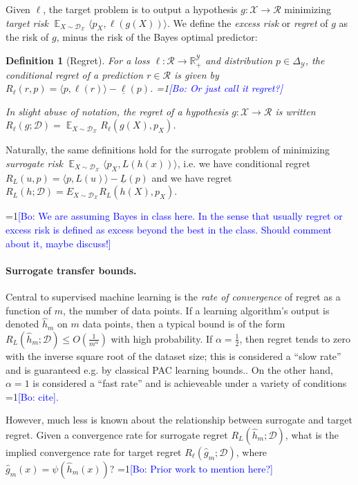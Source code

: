 \documentclass{article}
\newtheorem{definition}{Definition}
\newcommand{\Comments}{1}
\newcommand{\mynote}[2]{\ifnum\Comments=1\textcolor{#1}{#2}\fi}
\newcommand{\bo}[1]{\mynote{blue}{[Bo: #1]}}
\DeclareMathOperator{\E}{\mathbb{E}}  %
\newcommand{\reals}{\mathbb{R}}
\newcommand{\simplex}{\Delta_\Y}
\newcommand{\D}{\mathcal{D}}
\newcommand{\R}{\mathcal{R}}
\newcommand{\X}{\mathcal{X}}
\newcommand{\Y}{\mathcal{Y}}
\newcommand{\risk}[1]{\underline{#1}}
\newcommand{\inprod}[2]{\langle #1, #2 \rangle}%
\begin{document}
Given $\ell$, the target problem is to output a hypothesis $g: \X \to \R$ minimizing \emph{target risk} $\E_{X \sim \D_\X} \inprod{p_X}{\ell(g(X))}$.
We define the \emph{excess risk} or \emph{regret} of $g$ as the risk of $g$, minus the risk of the Bayes optimal predictor:
\begin{definition}[Regret] \label{def:full-regret}
  For a loss $\ell: \R \to \reals^{\Y}_+$ and distribution $p \in \simplex$, the \emph{conditional regret} of a prediction $r \in \R$ is given by $R_{\ell}(r,p) = \inprod{p}{\ell(r)} - \risk{\ell}(p)$. \bo{Or just call it regret?}

  In slight abuse of notation, the \emph{regret} of a hypothesis $g: \X \to \R$ is written $R_{\ell}(g; \D) = \E_{X \sim \D_{\X}} R_{\ell}(g(X), p_X)$.
\end{definition}
Naturally, the same definitions hold for the surrogate problem of minimizing \emph{surrogate risk} $\E_{X \sim \D_\X} \inprod{p_X}{L(h(x))}$, i.e. we have conditional regret $R_L(u,p) = \inprod{p}{L(u)} - \risk{L}(p)$ and we have regret $R_L(h;\D) = E_{X \sim \D_{\X}} R_L(h(X), p_X)$.

\bo{We are assuming Bayes in class here. In the sense that usually regret or excess risk is defined as excess beyond the best in the class. Should comment about it, maybe discuss!}

\paragraph{Surrogate transfer bounds.}
Central to supervised machine learning is the \emph{rate of convergence} of regret as a function of $m$, the number of data points.
If a learning algorithm's output is denoted $\hat{h}_m$ on $m$ data points, then a typical bound is of the form $R_L(\hat{h}_m;\D) \leq O\left(\frac{1}{m^{\alpha}}\right)$ with high probability.
If $\alpha = \frac{1}{2}$, then regret tends to zero with the inverse square root of the dataset size; this is considered a ``slow rate'' and is guaranteed e.g. by classical PAC learning bounds..
On the other hand, $\alpha = 1$ is considered a ``fast rate'' and is achieveable under a variety of conditions \bo{cite}.

However, much less is known about the relationship between surrogate and target regret.
Given a convergence rate for surrogate regret $R_L(\hat{h}_m;\D)$, what is the implied convergence rate for target regret $R_{\ell}(\hat{g}_m;\D)$, where $\hat{g}_m(x) = \psi(\hat{h}_m(x))$?
\bo{Prior work to mention here?}
\end{document}
